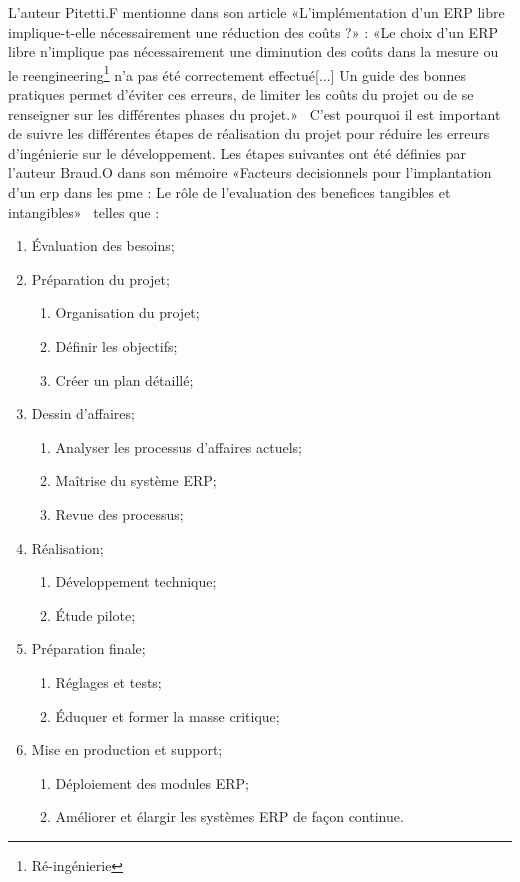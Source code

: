L'auteur Pitetti.F mentionne dans son article «L’implémentation d’un ERP libre implique-t-elle nécessairement une réduction des coûts ?» : «Le choix d’un ERP libre n’implique pas nécessairement une diminution des coûts dans la mesure ou le reengineering\footnote{Ré-ingénierie} n’a pas été correctement effectué[...] Un guide des bonnes pratiques permet d’éviter ces erreurs, de limiter les coûts du projet ou de se renseigner sur les différentes phases du projet.»~\cite{pitetti2010implementation} C'est pourquoi il est important de suivre les différentes étapes de réalisation du projet pour réduire les erreurs d'ingénierie sur le développement. Les étapes suivantes ont été définies par l'auteur Braud.O dans son mémoire «Facteurs decisionnels pour l’implantation d’un erp dans les pme : Le rôle de l’evaluation des benefices tangibles et intangibles»~\cite{uqam_erp_benefice_2008} telles que :
\begin{enumerate}
    \item Évaluation des besoins;
    \item Préparation du projet;
    \begin{enumerate}
        \item Organisation du projet;
        \item Définir les objectifs;
        \item Créer un plan détaillé;
    \end{enumerate}
    \item Dessin d’affaires;
    \begin{enumerate}
        \item Analyser les processus d’affaires actuels;
        \item Maîtrise du système ERP;
        \item Revue des processus;
    \end{enumerate}
    \item Réalisation;
    \begin{enumerate}
        \item Développement technique;
        \item Étude pilote;
    \end{enumerate}
    \item Préparation finale;
    \begin{enumerate}
        \item Réglages et tests;
        \item Éduquer et former la masse critique;
    \end{enumerate}
    \item Mise en production et support;
    \begin{enumerate}
        \item Déploiement des modules ERP;
        \item Améliorer et élargir les systèmes ERP de façon continue.
    \end{enumerate}
\end{enumerate}


